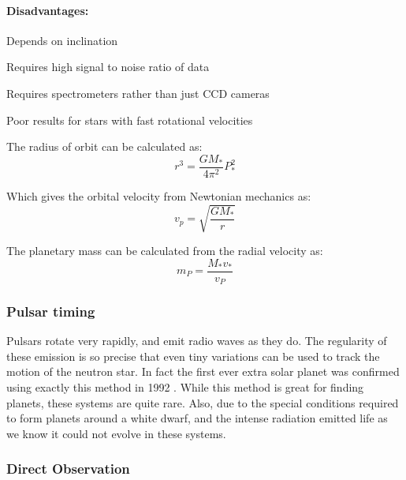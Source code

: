 \paragraph{Disadvantages:}
\begin{itemize*}
    \item Depends on inclination
    \item Requires high signal to noise ratio of data
    \item Requires spectrometers rather than just CCD cameras
    \item Poor results for stars with fast rotational velocities
\end{itemize*}

The radius of orbit can be calculated as:
\[r^3 =\frac{GM_*}{4\pi^2}P_*^2 \]

Which gives the orbital velocity from Newtonian mechanics as:
\[v_p =\sqrt{\frac{GM_*}{r}} \]

The planetary mass can be calculated from the radial velocity as:
\[ m_P = \frac{M_*v_*}{v_P} \]

\subsubsection{Pulsar timing}

Pulsars rotate very rapidly, and emit radio waves as they do. The regularity of these emission is so precise that even tiny variations can be used to track the motion of the neutron star. In fact the first ever extra solar planet was confirmed using exactly this method in 1992 \citep{wolszczan1992planetary}. While this method is great for finding planets, these systems are quite rare. Also, due to the special conditions required to form planets around a white dwarf, and the intense radiation emitted life as we know it could not evolve in these systems.

\subsubsection{Direct Observation}

